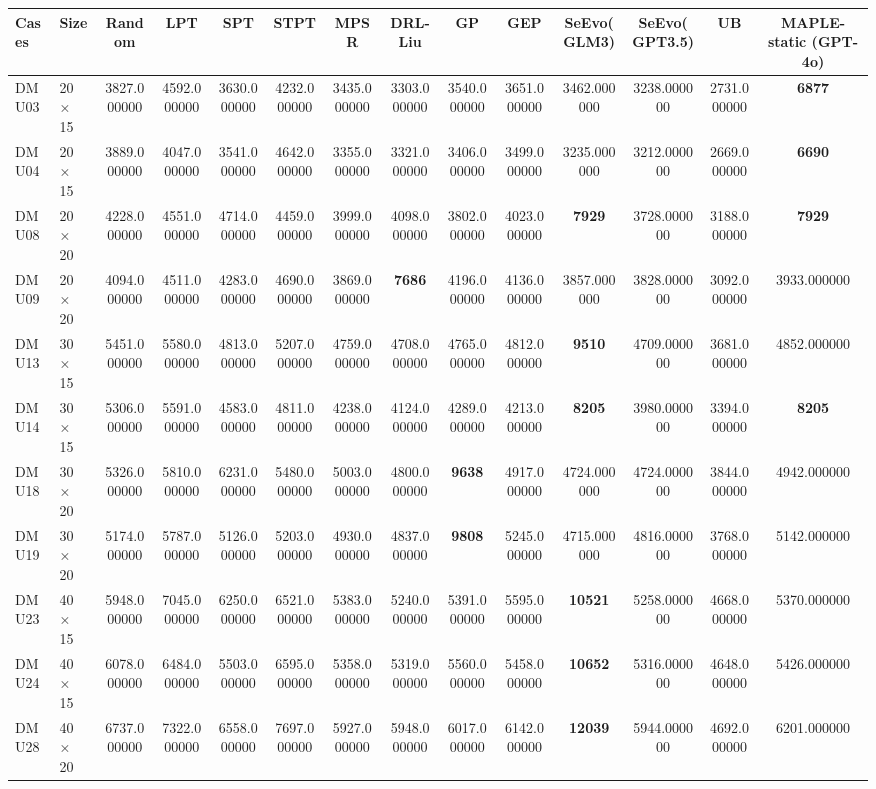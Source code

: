 \begin{tabular}{llcccccccccccc}
\toprule
Cases & Size & Random & LPT & SPT & STPT & MPSR & DRL-Liu & GP & GEP & SeEvo(GLM3) & SeEvo(GPT3.5) & UB & MAPLE-static (GPT-4o) \\
\midrule
DMU03 & 20 × 15 & 3827.000000 & 4592.000000 & 3630.000000 & 4232.000000 & 3435.000000 & 3303.000000 & 3540.000000 & 3651.000000 & 3462.000000 & 3238.000000 & 2731.000000 & \textbf{6877} \\
DMU04 & 20 × 15 & 3889.000000 & 4047.000000 & 3541.000000 & 4642.000000 & 3355.000000 & 3321.000000 & 3406.000000 & 3499.000000 & 3235.000000 & 3212.000000 & 2669.000000 & \textbf{6690} \\
DMU08 & 20 × 20 & 4228.000000 & 4551.000000 & 4714.000000 & 4459.000000 & 3999.000000 & 4098.000000 & 3802.000000 & 4023.000000 & \textbf{7929} & 3728.000000 & 3188.000000 & \textbf{7929} \\
DMU09 & 20 × 20 & 4094.000000 & 4511.000000 & 4283.000000 & 4690.000000 & 3869.000000 & \textbf{7686} & 4196.000000 & 4136.000000 & 3857.000000 & 3828.000000 & 3092.000000 & 3933.000000 \\
DMU13 & 30 × 15 & 5451.000000 & 5580.000000 & 4813.000000 & 5207.000000 & 4759.000000 & 4708.000000 & 4765.000000 & 4812.000000 & \textbf{9510} & 4709.000000 & 3681.000000 & 4852.000000 \\
DMU14 & 30 × 15 & 5306.000000 & 5591.000000 & 4583.000000 & 4811.000000 & 4238.000000 & 4124.000000 & 4289.000000 & 4213.000000 & \textbf{8205} & 3980.000000 & 3394.000000 & \textbf{8205} \\
DMU18 & 30 × 20 & 5326.000000 & 5810.000000 & 6231.000000 & 5480.000000 & 5003.000000 & 4800.000000 & \textbf{9638} & 4917.000000 & 4724.000000 & 4724.000000 & 3844.000000 & 4942.000000 \\
DMU19 & 30 × 20 & 5174.000000 & 5787.000000 & 5126.000000 & 5203.000000 & 4930.000000 & 4837.000000 & \textbf{9808} & 5245.000000 & 4715.000000 & 4816.000000 & 3768.000000 & 5142.000000 \\
DMU23 & 40 × 15 & 5948.000000 & 7045.000000 & 6250.000000 & 6521.000000 & 5383.000000 & 5240.000000 & 5391.000000 & 5595.000000 & \textbf{10521} & 5258.000000 & 4668.000000 & 5370.000000 \\
DMU24 & 40 × 15 & 6078.000000 & 6484.000000 & 5503.000000 & 6595.000000 & 5358.000000 & 5319.000000 & 5560.000000 & 5458.000000 & \textbf{10652} & 5316.000000 & 4648.000000 & 5426.000000 \\
DMU28 & 40 × 20 & 6737.000000 & 7322.000000 & 6558.000000 & 7697.000000 & 5927.000000 & 5948.000000 & 6017.000000 & 6142.000000 & \textbf{12039} & 5944.000000 & 4692.000000 & 6201.000000 \\

\end{tabular}
